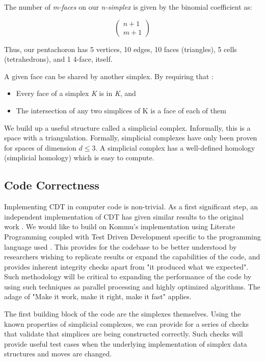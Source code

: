 \documentclass{article}
\begin{document}
The number of \emph{m-faces} on our \emph{n-simplex} is given by the binomial coefficient as:

\begin{equation}
\left(\begin{array}{c}n+1\\m+1\end{array}\right)
\end{equation}

Thus, our pentachoron has 5 vertices, 10 edges, 10 faces (triangles), 5 cells (tetrahedrons), and 1 4-face, itself.

A given face can be shared by another simplex. By requiring that \cite{weisstein1}:

\begin{itemize}
\item Every face of a simplex \emph{K} is in \emph{K}, and
\item The intersection of any two simplices of K is a face of each of them
\end{itemize}

We build up a useful structure called a simplicial complex. Informally, this is a space with a triangulation. Formally, simplicial complexes have only been proven for spaces of dimension $d\le3$. A simplicial complex has a well-defined homology (simplicial homology) which is easy to compute.

\subsection{Code Correctness}

Implementing CDT in computer code is non-trivial. As a first significant step, an independent implementation of CDT has given similar results to the original work \cite{kommu2011}. We would like to build on Kommu's implementation using Literate Programming \cite{knuth_literate_1984} coupled with Test Driven Development specific to the programming language used \cite{rathore_clojure_2011}. This provides for the codebase to be better understood by researchers wishing to replicate results or expand the capabilities of the code, and provides inherent integrity checks apart from "it produced what we expected". Such methodology will be critical to expanding the performance of the code by using such techniques as parallel processing and highly optimized algorithms. The adage of "Make it work, make it right, make it fast" applies.

The first building block of the code are the simplexes themselves. Using the known properties of simplicial complexes, we can provide for a series of checks that validate that simplices are being constructed correctly. Such checks will provide useful test cases when the underlying implementation of simplex data structures and moves are changed.
\end{document}
